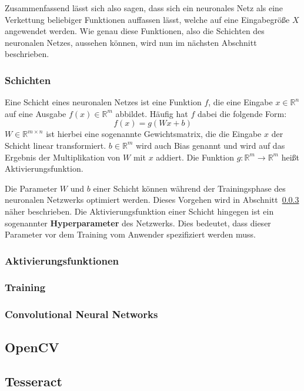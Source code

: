 Zusammenfassend l\"asst sich also sagen, dass sich ein neuronales Netz als
eine Verkettung beliebiger Funktionen auffassen l\"asst, welche auf
eine Eingabegr\"o{\ss}e $X$ angewendet werden.
Wie genau diese Funktionen, also die Schichten des neuronalen Netzes,
aussehen k\"onnen, wird nun im n\"achsten
Abschnitt beschrieben.

\subsubsection{Schichten}

Eine Schicht eines neuronalen Netzes ist eine Funktion $f$, die eine
Eingabe $x \in \mathbb{R}^n$ auf eine Ausgabe $f(x) \in \mathbb{R}^m$
abbildet. H\"aufig hat $f$ dabei die folgende Form:
\begin{equation}
    f(x) = g(Wx + b)
\end{equation}
$W \in \mathbb{R}^{m \times n}$ ist hierbei eine sogenannte Gewichtsmatrix,
die die Eingabe $x$ der Schicht linear transformiert.
$b \in \mathbb{R}^m$ wird auch Bias genannt und wird auf das Ergebnis der
Multiplikation von $W$ mit $x$ addiert.
Die Funktion $g: \mathbb{R}^m \rightarrow \mathbb{R}^m$ hei{\ss}t
Aktivierungsfunktion.

Die Parameter $W$ und $b$ einer Schicht k\"onnen w\"ahrend der Trainingsphase
des neuronalen Netzwerks optimiert werden. Dieses Vorgehen wird in
Abschnitt~\ref{sec:training} n\"aher beschrieben.
Die Aktivierungsfunktion einer Schicht hingegen ist ein sogenannter
\textbf{Hyperparameter} des Netzwerks. Dies bedeutet, dass dieser
Parameter vor dem Training vom Anwender spezifiziert werden muss.

\subsubsection{Aktivierungsfunktionen}


\subsubsection{Training}
\label{sec:training}

\subsubsection{Convolutional Neural Networks}

\subsection{OpenCV}

\subsection{Tesseract}